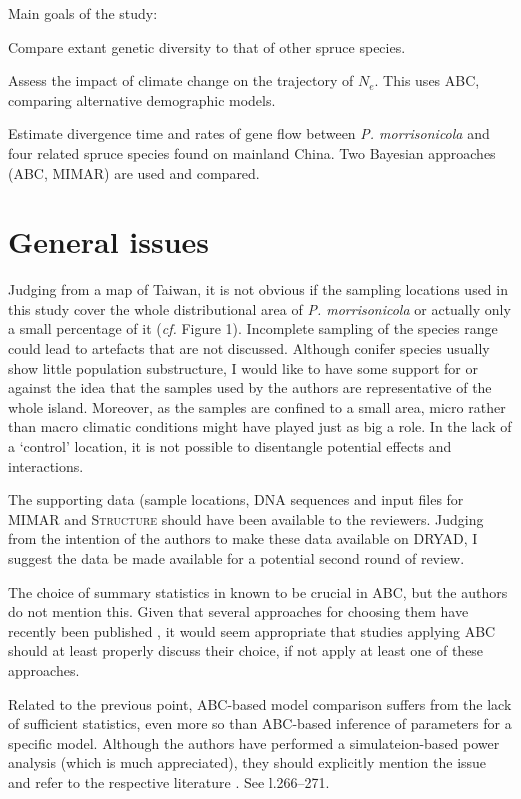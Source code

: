 \documentclass[11pt]{article}
\newenvironment{my_enumerate}
{\begin{enumerate}
  \setlength{\itemsep}{2pt}
  \setlength{\parskip}{0pt}
  \setlength{\parsep}{0pt}}
{\end{enumerate}}
\begin{document}
Main goals of the study:
\begin{my_enumerate}
	\item Compare extant genetic diversity to that of other spruce species.
	\item Assess the impact of climate change on the trajectory of $N_e$. This uses ABC, comparing alternative demographic models.
	\item Estimate divergence time and rates of gene flow between \emph{P. morrisonicola} and four related spruce species found on mainland China. Two Bayesian approaches (ABC, MIMAR) are used and compared.
	\
\end{my_enumerate}


\section{General issues}

\begin{my_enumerate}
	\item Judging from a map of Taiwan, it is not obvious if the sampling locations used in this study cover the whole distributional area of \emph{P. morrisonicola} or actually only a small percentage of it (\emph{cf.} Figure 1). Incomplete sampling of the species range could lead to artefacts that are not discussed. Although conifer species usually show little population substructure, I would like to have some support for or against the idea that the samples used by the authors are representative of the whole island. Moreover, as the samples are confined to a small area, micro rather than macro climatic conditions might have played just as big a role. In the lack of a `control' location, it is not possible to disentangle potential effects and interactions.
	\item The supporting data (sample locations, DNA sequences and input files for \textsc{MIMAR} and \textsc{Structure} should have been available to the reviewers. Judging from the intention of the authors to make these data available on DRYAD, I suggest the data be made available for a potential second round of review.
	\item The choice of summary statistics in known to be crucial in ABC, but the authors do not mention this. Given that several approaches for choosing them have recently been published \citep[][]{Joyce:2008sf, Wegmann:2009sf, Nunes:2010fk, Fearnhead:2011uq,Aeschbacher:2011fk}, it would seem appropriate that studies applying ABC should at least properly discuss their choice, if not apply at least one of these approaches.
	\item Related to the previous point, ABC-based model comparison suffers from the lack of sufficient statistics, even more so than ABC-based inference of parameters for a specific model. Although the authors have performed a simulateion-based power analysis (which is much appreciated), they should explicitly mention the issue and refer to the respective literature \cite[\emph{e.g.}][]{Robert:2011fk}. See l.266--271.
	
	\end{my_enumerate}
	
\end{document}
